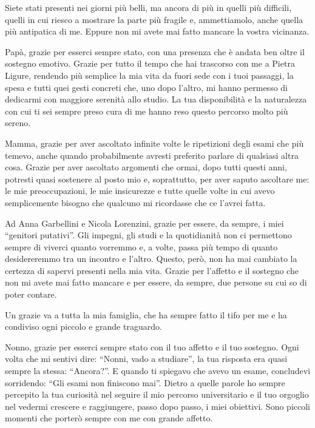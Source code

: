 Siete stati presenti nei giorni più belli, ma ancora di più in quelli più difficili, quelli in cui riesco a mostrare la parte più fragile e, ammettiamolo, anche quella più antipatica di me. Eppure non mi avete mai fatto mancare la vostra vicinanza.

Papà, grazie per esserci sempre stato, con una presenza che è andata ben oltre il sostegno emotivo. Grazie per tutto il tempo che hai trascorso con me a Pietra Ligure, rendendo più semplice la mia vita da fuori sede con i tuoi passaggi, la spesa e tutti quei gesti concreti che, uno dopo l'altro, mi hanno permesso di dedicarmi con maggiore serenità allo studio. La tua disponibilità e la naturalezza con cui ti sei sempre preso cura di me hanno reso questo percorso molto più sereno.

Mamma, grazie per aver ascoltato infinite volte le ripetizioni degli esami che più temevo, anche quando probabilmente avresti preferito parlare di qualsiasi altra cosa. Grazie per aver ascoltato argomenti che ormai, dopo tutti questi anni, potresti quasi sostenere al posto mio e, soprattutto, per aver saputo ascoltare me: le mie preoccupazioni, le mie insicurezze e tutte quelle volte in cui avevo semplicemente bisogno che qualcuno mi ricordasse che ce l'avrei fatta.

Ad Anna Garbellini e Nicola Lorenzini, grazie per essere, da sempre, i miei ``genitori putativi''. Gli impegni, gli studi e la quotidianità non ci permettono sempre di viverci quanto vorremmo e, a volte, passa più tempo di quanto desidereremmo tra un incontro e l'altro. Questo, però, non ha mai cambiato la certezza di sapervi presenti nella mia vita. Grazie per l'affetto e il sostegno che non mi avete mai fatto mancare e per essere, da sempre, due persone su cui so di poter contare.

Un grazie va a tutta la mia famiglia, che ha sempre fatto il tifo per me e ha condiviso ogni piccolo e grande traguardo.

Nonno, grazie per esserci sempre stato con il tuo affetto e il tuo sostegno. Ogni volta che mi sentivi dire: ``Nonni, vado a studiare'', la tua risposta era quasi sempre la stessa: ``Ancora?''. E quando ti spiegavo che avevo un esame, concludevi sorridendo: ``Gli esami non finiscono mai''. Dietro a quelle parole ho sempre percepito la tua curiosità nel seguire il mio percorso universitario e il tuo orgoglio nel vedermi crescere e raggiungere, passo dopo passo, i miei obiettivi. Sono piccoli momenti che porterò sempre con me con grande affetto.

